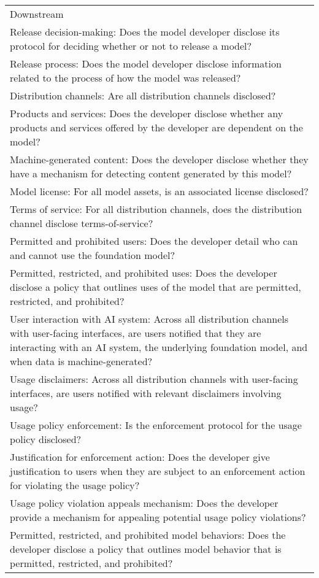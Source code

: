 \begin{table}
\centering
\tiny
\begin{tabular}{l}
Downstream \\
Release decision-making: Does the model developer disclose its protocol for deciding whether or not to release a model? \\
Release process: Does the model developer disclose information related to the process of how the model was released? \\
Distribution channels: Are all distribution channels disclosed?  \\
Products and services: Does the developer disclose whether any products and services offered by the developer are dependent on the model? \\
Machine-generated content: Does the developer disclose whether they have a mechanism for detecting content generated by this model? \\
Model license: For all model assets, is an associated license disclosed?  \\
Terms of service: For all distribution channels, does the distribution channel disclose terms-of-service? \\
Permitted and prohibited users: Does the developer detail who can and cannot use the foundation model?  \\
Permitted, restricted, and prohibited uses: Does the developer disclose a policy that outlines uses of the model that are permitted, restricted, and prohibited?  \\
User interaction with AI system: Across all distribution channels with user-facing interfaces, are users notified that they are interacting with an AI system, the underlying foundation model, and when data is machine-generated? \\
Usage disclaimers: Across all distribution channels with user-facing interfaces, are users notified with relevant disclaimers involving usage?  \\
Usage policy enforcement: Is the enforcement protocol for the usage policy disclosed? \\
Justification for enforcement action: Does the developer give justification to users when they are subject to an enforcement action for violating the usage policy?  \\
Usage policy violation appeals mechanism: Does the developer provide a mechanism for appealing potential usage policy violations?   \\
Permitted, restricted, and prohibited model behaviors: Does the developer disclose a policy that outlines model behavior that is permitted, restricted, and prohibited? \\

\end{tabular}
\end{table}
